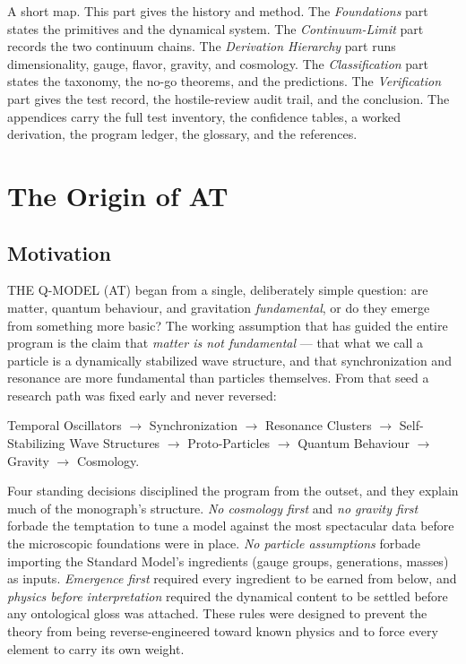 \documentclass[10pt,twoside,openany]{book}
\begin{document}
A short map. This part gives the history and method. The \emph{Foundations} part states
the primitives and the dynamical system. The \emph{Continuum-Limit} part records the two
continuum chains. The \emph{Derivation Hierarchy} part runs dimensionality, gauge, flavor,
gravity, and cosmology. The \emph{Classification} part states the taxonomy, the no-go
theorems, and the predictions. The \emph{Verification} part gives the test record, the
hostile-review audit trail, and the conclusion. The appendices carry the full test
inventory, the confidence tables, a worked derivation, the program ledger, the glossary,
and the references.

\chapter{The Origin of AT}
\label{ch:origin}

\section{Motivation}

THE Q-MODEL (AT) began from a single, deliberately simple question: are matter, quantum
behaviour, and gravitation \emph{fundamental}, or do they emerge from something more
basic? The working assumption that has guided the entire program is the claim that
\emph{matter is not fundamental} --- that what we call a particle is a dynamically
stabilized wave structure, and that synchronization and resonance are more fundamental
than particles themselves. From that seed a research path was fixed early and never
reversed:

\begin{center}
Temporal Oscillators $\to$ Synchronization $\to$ Resonance Clusters $\to$
Self-Stabilizing Wave Structures $\to$ Proto-Particles $\to$ Quantum Behaviour $\to$
Gravity $\to$ Cosmology.
\end{center}

Four standing decisions disciplined the program from the outset, and they explain much of
the monograph's structure. \emph{No cosmology first} and \emph{no gravity first} forbade
the temptation to tune a model against the most spectacular data before the microscopic
foundations were in place. \emph{No particle assumptions} forbade importing the Standard
Model's ingredients (gauge groups, generations, masses) as inputs. \emph{Emergence first}
required every ingredient to be earned from below, and \emph{physics before
interpretation} required the dynamical content to be settled before any ontological gloss
was attached. These rules were designed to prevent the theory from being
reverse-engineered toward known physics and to force every element to carry its own
weight.
\end{document}
